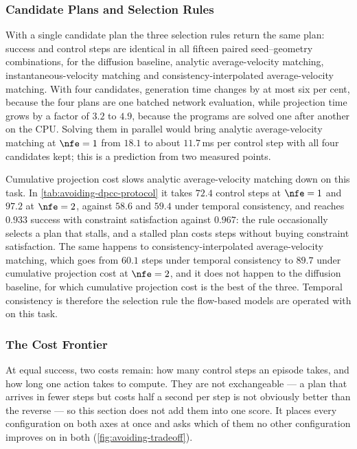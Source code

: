 \subsubsection{Candidate Plans and Selection Rules}\label{sec:res:ablations}

With a single candidate plan the three selection rules return the same plan: success and control steps
are identical in all fifteen paired seed--geometry combinations, for the diffusion baseline, analytic average-velocity matching,
instantaneous-velocity matching and consistency-interpolated average-velocity matching. With four candidates, generation time changes by at most six per
cent, because the four plans are one batched network evaluation, while projection time grows by a factor
of $3.2$ to $4.9$, because the programs are solved one after another on the CPU. Solving them in parallel
would bring analytic average-velocity matching at $\nfe=1$ from $18.1$ to about $11.7$\,ms per control step with all four
candidates kept; this is a prediction from two measured points.

Cumulative projection cost slows analytic average-velocity matching down on this task. In
\autoref{tab:avoiding-dpcc-protocol} it takes $72.4$ control steps at $\nfe=1$ and $97.2$ at $\nfe=2$,
against $58.6$ and $59.4$ under temporal consistency, and reaches $0.933$ success with constraint
satisfaction against $0.967$: the rule occasionally selects a plan that stalls, and a stalled plan costs
steps without buying constraint satisfaction. The same happens to consistency-interpolated
average-velocity matching, which goes from $60.1$ steps under temporal consistency to $89.7$ under
cumulative projection cost at $\nfe=2$, and it does not happen to the diffusion baseline, for which
cumulative projection cost is the best of the three. Temporal consistency is therefore the selection rule
the flow-based models are operated with on this task.

\subsubsection{The Cost Frontier}\label{sec:res:avoiding:pareto}

At equal success, two costs remain: how many control steps an episode takes, and how long one action takes
to compute. They are not exchangeable --- a plan that arrives in fewer steps but costs half a second per
step is not obviously better than the reverse --- so this section does not add them into one score. It
places every configuration on both axes at once and asks which of them no other configuration improves on in both
(\autoref{fig:avoiding-tradeoff}).

